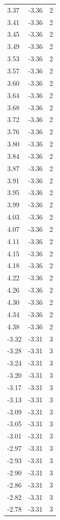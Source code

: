 \begin{longtable}{lrr}
  3.37 & -3.36 & 2 \\
  3.41 & -3.36 & 2 \\
  3.45 & -3.36 & 2 \\
  3.49 & -3.36 & 2 \\
  3.53 & -3.36 & 2 \\
  3.57 & -3.36 & 2 \\
  3.60 & -3.36 & 2 \\
  3.64 & -3.36 & 2 \\
  3.68 & -3.36 & 2 \\
  3.72 & -3.36 & 2 \\
  3.76 & -3.36 & 2 \\
  3.80 & -3.36 & 2 \\
  3.84 & -3.36 & 2 \\
  3.87 & -3.36 & 2 \\
  3.91 & -3.36 & 2 \\
  3.95 & -3.36 & 2 \\
  3.99 & -3.36 & 2 \\
  4.03 & -3.36 & 2 \\
  4.07 & -3.36 & 2 \\
  4.11 & -3.36 & 2 \\
  4.15 & -3.36 & 2 \\
  4.18 & -3.36 & 2 \\
  4.22 & -3.36 & 2 \\
  4.26 & -3.36 & 2 \\
  4.30 & -3.36 & 2 \\
  4.34 & -3.36 & 2 \\
  4.38 & -3.36 & 2 \\
  -3.32 & -3.31 & 3 \\
  -3.28 & -3.31 & 3 \\
  -3.24 & -3.31 & 3 \\
  -3.20 & -3.31 & 3 \\
  -3.17 & -3.31 & 3 \\
  -3.13 & -3.31 & 3 \\
  -3.09 & -3.31 & 3 \\
  -3.05 & -3.31 & 3 \\
  -3.01 & -3.31 & 3 \\
  -2.97 & -3.31 & 3 \\
  -2.93 & -3.31 & 3 \\
  -2.90 & -3.31 & 3 \\
  -2.86 & -3.31 & 3 \\
  -2.82 & -3.31 & 3 \\
  -2.78 & -3.31 & 3 \\

\end{longtable}
